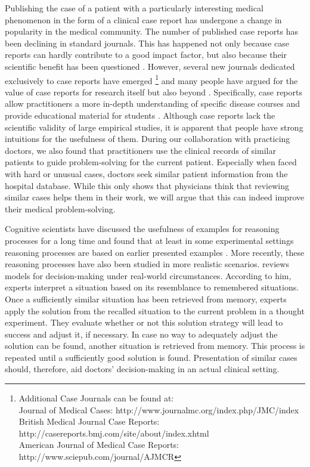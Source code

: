 Publishing the case of a patient with a particularly interesting medical phenomenon in the form of a clinical case report has undergone a change in popularity in the medical community.
The number of published case reports has been declining in standard journals. This has happened not only because case reports can hardly contribute to a good impact factor, but also because their scientific benefit has been questioned \citep{Mason2001}. However, several new journals dedicated exclusively to case reports have emerged \citep{Kidd2007}\footnote{Additional Case Journals can be found at:\\Journal of Medical Cases: http://www.journalmc.org/index.php/JMC/index\\British Medical Journal Case Reports: http://casereports.bmj.com/site/about/index.xhtml\\American Journal of Medical Case Reports: http://www.sciepub.com/journal/AJMCR} and many people have argued for the value of case reports for research itself but also beyond \citep{Williams2003,Dib2008,Sandu2016}. Specifically, case reports allow practitioners a more in-depth understanding of specific disease courses and provide educational material for students \citep{Nissen2014}. Although case reports lack the scientific validity of large empirical studies, it is apparent that people have strong intuitions for the usefulness of them. During our collaboration with practicing doctors, we also found that practitioners use the clinical records of similar patients to guide problem-solving for the current patient. Especially when faced with hard or unusual cases, doctors seek similar patient information from the hospital database. While this only shows that physicians think that reviewing similar cases helps them in their work, we will argue that this can indeed improve their medical problem-solving. 

Cognitive scientists have discussed the usefulness of examples for reasoning processes for a long time and found that at least in some experimental settings reasoning processes are based on earlier presented examples \citep{Medin1978}. More recently, these reasoning processes have also been studied in more realistic scenarios. \citet{Klein2008} reviews models for decision-making under real-world circumstances. According to him, experts interpret a situation based on its resemblance to remembered situations. Once a sufficiently similar situation has been retrieved from memory, experts apply the solution from the recalled situation to the current problem in a thought experiment. They evaluate whether or not this solution strategy will lead to success and adjust it, if necessary. In case no way to adequately adjust the solution can be found, another situation is retrieved from memory. This process is repeated until a sufficiently good solution is found. Presentation of similar cases should, therefore, aid doctors' decision-making in an actual clinical setting.

